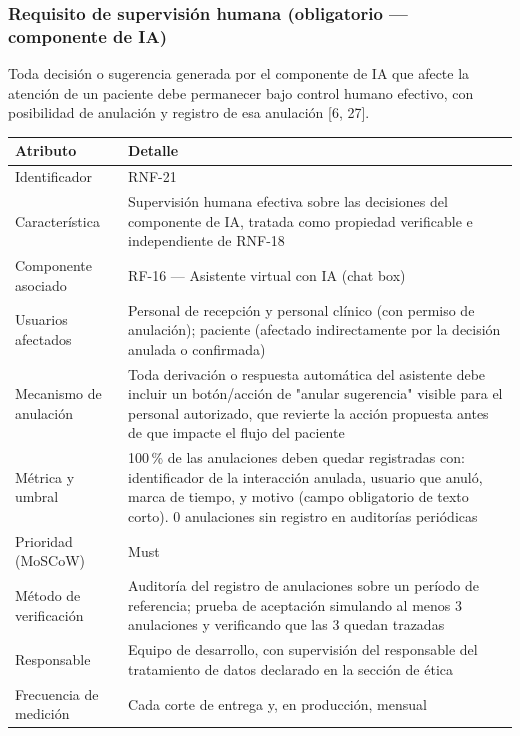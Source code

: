 \documentclass[11pt,a4paper]{article}
\begin{document}
	\subsubsection{Requisito de supervisión humana (obligatorio — componente de IA)}
	
	Toda decisión o sugerencia generada por el componente de IA que afecte
	la atención de un paciente debe permanecer bajo control humano
	efectivo, con posibilidad de anulación y registro de esa anulación
	[6, 27].
	
	\begin{center}
		\begin{tabular}{|p{3.2cm}|p{9.5cm}|}
			\hline
			\textbf{Atributo} & \textbf{Detalle} \\
			\hline
			Identificador & RNF-21 \\
			\hline
			Característica &
			Supervisión humana efectiva sobre las decisiones del componente de IA,
			tratada como propiedad verificable e independiente de RNF-18 \\
			\hline
			Componente asociado & RF-16 --- Asistente virtual con IA (chat box) \\
			\hline
			Usuarios afectados &
			Personal de recepción y personal clínico (con permiso de anulación);
			paciente (afectado indirectamente por la decisión anulada o
			confirmada) \\
			\hline
			Mecanismo de anulación &
			Toda derivación o respuesta automática del asistente debe incluir un
			botón/acción de "anular sugerencia" visible para el personal
			autorizado, que revierte la acción propuesta antes de que impacte el
			flujo del paciente \\
			\hline
			Métrica y umbral &
			100\,\% de las anulaciones deben quedar registradas con: identificador
			de la interacción anulada, usuario que anuló, marca de tiempo, y
			motivo (campo obligatorio de texto corto). 0 anulaciones sin registro
			en auditorías periódicas \\
			\hline
			Prioridad (MoSCoW) & Must \\
			\hline
			Método de verificación &
			Auditoría del registro de anulaciones sobre un período de referencia;
			prueba de aceptación simulando al menos 3 anulaciones y verificando
			que las 3 quedan trazadas \\
			\hline
			Responsable & Equipo de desarrollo, con supervisión del responsable del
			tratamiento de datos declarado en la sección de ética \\
			\hline
			Frecuencia de medición & Cada corte de entrega y, en producción,
			mensual \\
			\hline
		\end{tabular}
	\end{center}
	
\end{document}
